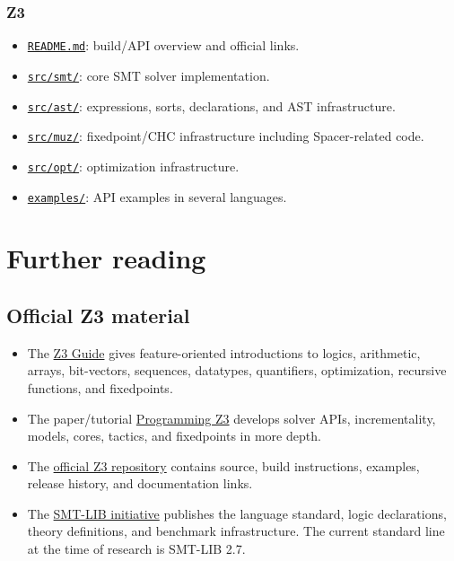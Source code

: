 \documentclass[10pt,letterpaper,oneside]{report}
\def\ZthreeCommit{bc4585e0ba5b1041f301b0c16ba652645729e796}
\def\ZthreeBase{https://github.com/Z3Prover/z3/blob/\ZthreeCommit/}
\newcommand{\zpath}[1]{\href{\ZthreeBase#1}{\nolinkurl{#1}}}
\begin{document}
\subsection{Z3}

\begin{itemize}
\item \zpath{README.md}: build/API overview and official links.
\item \zpath{src/smt/}: core SMT solver implementation.
\item \zpath{src/ast/}: expressions, sorts, declarations, and AST infrastructure.
\item \zpath{src/muz/}: fixedpoint/CHC infrastructure including Spacer-related code.
\item \zpath{src/opt/}: optimization infrastructure.
\item \zpath{examples/}: API examples in several languages.
\end{itemize}

\chapter{Further reading}
\label{app:further-reading}

\section{Official Z3 material}

\begin{itemize}
\item The \href{https://microsoft.github.io/z3guide/}{Z3 Guide} gives feature-oriented introductions to logics, arithmetic, arrays, bit-vectors, sequences, datatypes, quantifiers, optimization, recursive functions, and fixedpoints.
\item The paper/tutorial \href{https://z3prover.github.io/papers/programmingz3.html}{Programming Z3} develops solver APIs, incrementality, models, cores, tactics, and fixedpoints in more depth.
\item The \href{https://github.com/Z3Prover/z3}{official Z3 repository} contains source, build instructions, examples, release history, and documentation links.
\item The \href{https://smt-lib.org/}{SMT-LIB initiative} publishes the language standard, logic declarations, theory definitions, and benchmark infrastructure. The current standard line at the time of research is SMT-LIB 2.7.
\end{itemize}
\end{document}
